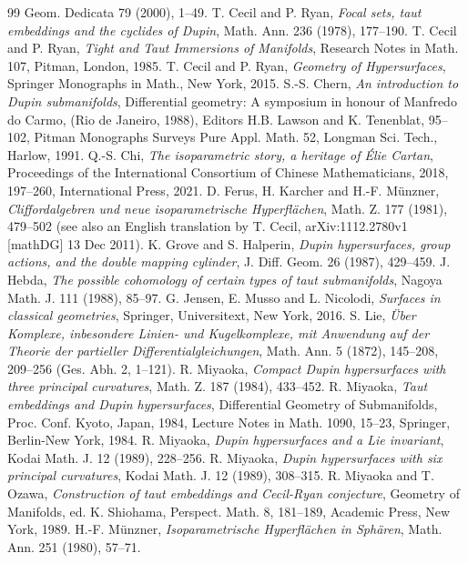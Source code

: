 \documentclass[12pt]{article}
\begin{document}
\begin{thebibliography}{99}
Geom. Dedicata 79 (2000), 1--49.
 T. Cecil and P. Ryan, {\em Focal sets, taut embeddings and the cyclides of Dupin}, Math. Ann.
236 (1978), 177--190.
 T. Cecil and P. Ryan,
{\em Tight and Taut Immersions of Manifolds}, Research Notes in Math. 107, Pitman,
London, 1985.
 T. Cecil and P. Ryan,
{\em Geometry of Hypersurfaces}, Springer Monographs in Math., New York, 2015.
 S.-S. Chern, {\em An introduction to Dupin submanifolds}, Differential geometry: A symposium in
honour of Manfredo do Carmo, (Rio de Janeiro, 1988), Editors H.B. Lawson and K. Tenenblat, 95--102, 
Pitman Monographs Surveys Pure Appl. Math. 52, Longman Sci. Tech., Harlow, 1991.
 Q.-S. Chi, {\em The isoparametric story, a heritage of \'{E}lie Cartan}, 
Proceedings of the International Consortium of Chinese Mathematicians, 2018, 197--260,
International Press, 2021.
 D. Ferus, H. Karcher and H.-F. M\"{u}nzner,
{\em Cliffordalgebren und neue isoparametrische
Hyperfl\"{a}chen}, Math. Z. 177 (1981), 479--502 (see also an English translation by T. Cecil, arXiv:1112.2780v1 [mathDG] 13 Dec 2011).
 K. Grove and S. Halperin, {\em Dupin hypersurfaces, group actions, and the double mapping cylinder},
J. Diff. Geom. 26 (1987), 429--459.
 J. Hebda, {\em The possible
cohomology of certain types of taut submanifolds}, Nagoya
Math. J. 111 (1988), 85--97.
 G. Jensen, E. Musso and L. Nicolodi, {\em Surfaces in classical geometries}, 
Springer, Universitext, New York, 2016.
 S. Lie, {\em \"{U}ber Komplexe, inbesondere Linien-
und Kugelkomplexe, mit Anwendung auf der Theorie der partieller Differentialgleichungen},
Math. Ann. 5 (1872), 145--208, 209--256 (Ges. Abh. 2, 1--121).
 R. Miyaoka, {\em Compact Dupin hypersurfaces
with three principal curvatures}, Math. Z. 187 (1984),
433--452.
 R. Miyaoka, {\em Taut embeddings
and Dupin hypersurfaces}, Differential Geometry of Submanifolds,
Proc. Conf. Kyoto, Japan, 1984, Lecture Notes in Math. 1090, 15--23,
Springer, Berlin-New York, 1984.
 R. Miyaoka, {\em Dupin hypersurfaces and a Lie invariant}, Kodai Math. J. 12 (1989), 228--256.
 R. Miyaoka,
{\em Dupin hypersurfaces with six principal curvatures}, Kodai Math. J. 12 (1989), 
308--315.
 R. Miyaoka and T. Ozawa, {\em Construction of taut
embeddings and Cecil-Ryan conjecture}, Geometry of Manifolds,
ed. K. Shiohama, Perspect. Math. 8, 181--189,
Academic Press, New York, 1989.
 H.-F. M\"{u}nzner, {\em Isoparametrische Hyperfl\"{a}chen in Sph\"{a}ren}, Math. Ann. 251 (1980), 57--71.

\end{thebibliography}
\end{document}

